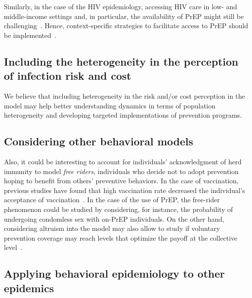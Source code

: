 Similarly, in the case of the HIV epidemiology, accessing HIV care in low- and middle-income settings and, in particular, the availability of PrEP might still be challenging~\cite[]{UNAIDS_Data2019}. Hence, context-specific strategies to facilitate access to PrEP should be implemented~\cite[]{Rebe2019}. 

\subsection{Including the heterogeneity in the perception of infection risk and cost}

We believe that including heterogeneity in the risk and/or cost perception in the model may help better understanding dynamics in terms of population heterogeneity and developing targeted implementations of prevention programs.

\subsection{Considering other behavioral models}
Also, it could be interesting to account for individuals' acknowledgment of herd immunity to model \textit{free riders}, individuals who decide not to adopt prevention hoping to benefit from others' preventive behaviors. In the case of vaccination, previous studies have found that high vaccination rate decreased the individual's acceptance of vaccination~\cite[]{Ibuka2014}. In the case of the use of PrEP, the free-rider phenomenon could be studied by considering, for instance, the probability of undergoing condomless sex with on-PrEP individuals. On the other hand, considering altruism into the model may also allow to study if voluntary prevention coverage may reach levels that optimize the payoff at the collective level~\cite[]{Shim2012}. 



\subsection{Applying behavioral epidemiology to other epidemics}


